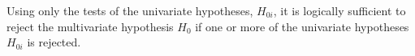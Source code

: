\documentclass[letterpaper,12pt,oneside,final]{article}
\newcommand{\sv}[1]{\boldsymbol{#1}}   %
\begin{document}
Using only the tests of the univariate hypotheses, $H_{0i}$, it is logically sufficient to reject the multivariate hypothesis $H_0$ if one or more of the univariate hypotheses $H_{0i}$ is rejected.  
\end{document}
